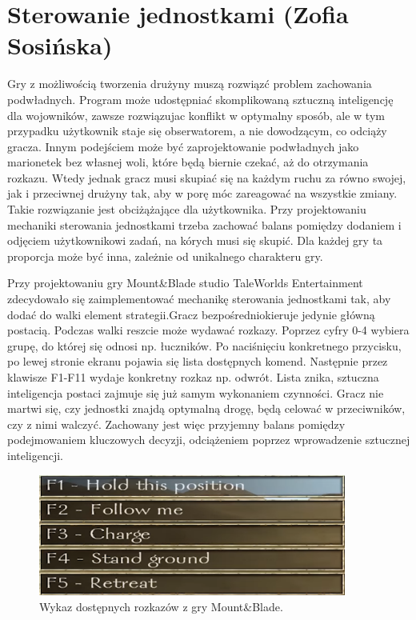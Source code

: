 \section{Sterowanie jednostkami (Zofia Sosińska)}\label{chap:mb}
Gry z możliwością tworzenia drużyny muszą rozwiązć problem zachowania podwładnych. Program może udostępniać
skomplikowaną sztuczną inteligencję dla wojowników, zawsze rozwiązujac konflikt w optymalny sposób, ale w tym przypadku 
użytkownik staje się obserwatorem, a nie dowodzącym, co odciąży gracza. Innym podejściem może być zaprojektowanie podwładnych jako 
marionetek bez własnej woli, które będą biernie czekać, aż do otrzymania rozkazu. Wtedy jednak gracz musi skupiać się na 
każdym ruchu za równo swojej, jak i przeciwnej drużyny tak, aby w porę móc zareagować na wszystkie zmiany. Takie rozwiązanie 
jest obciżążające dla użytkownika. Przy projektowaniu mechaniki sterowania jednostkami trzeba zachować balans pomiędzy 
dodaniem i odjęciem użytkownikowi zadań, na kórych musi się skupić. Dla każdej gry ta proporcja może być inna, zależnie
od unikalnego charakteru gry.

Przy projektowaniu gry Mount\&Blade studio TaleWorlds Entertainment zdecydowało się zaimplementować mechanikę sterowania jednostkami tak, aby 
dodać do walki element strategii.Gracz bezpośredniokieruje jedynie główną postacią. Podczas walki reszcie może wydawać rozkazy. Poprzez
cyfry 0-4 wybiera grupę, do której się odnosi np. łuczników. Po naciśnięciu konkretnego przycisku, po lewej stronie ekranu pojawia się lista dostępnych komend.
Następnie przez klawisze F1-F11 wydaje konkretny rozkaz np. odwrót. Lista znika, sztuczna inteligencja postaci zajmuje się już samym wykonaniem czynności. 
Gracz nie martwi się, czy jednostki znajdą optymalną drogę, 
będą celować w przeciwników, czy z nimi walczyć. Zachowany jest więc przyjemny balans pomiędzy podejmowaniem kluczowych decyzji,
odciążeniem poprzez wprowadzenie sztucznej inteligencji.

\begin{figure}[h!tbp]
    \centering
    \includegraphics[width=0.9\textwidth]{images/ui/commandsMountBla.png}
    \caption{Wykaz dostępnych rozkazów z gry Mount\&Blade.}\label{fig:MountnBlade}
    \label{fig:mnb}
\end{figure}
